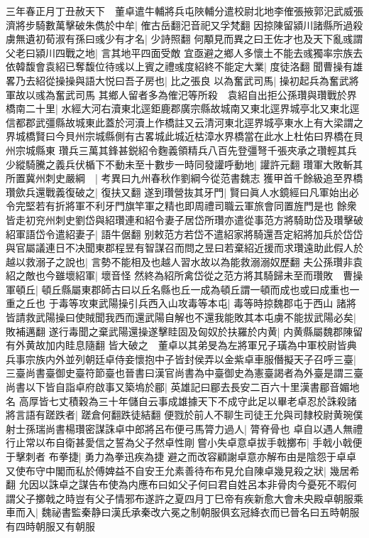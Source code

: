 三年春正月丁丑赦天下　董卓遣牛輔將兵屯陜輔分遣校尉北地李傕張掖郭汜武威張濟將步騎數萬擊破朱儁於中牟|{
	傕古岳翻汜音祀又孚梵翻}
因掠陳留潁川諸縣所過殺虜無遺初荀淑有孫曰彧少有才名|{
	少詩照翻}
何顒見而異之曰王佐才也及天下亂彧謂父老曰潁川四戰之地|{
	言其地平四面受敵}
宜亟避之鄉人多懷土不能去彧獨率宗族去依韓馥會袁紹已奪馥位待彧以上賓之禮彧度紹終不能定大業|{
	度徒洛翻}
聞曹操有雄畧乃去紹從操操與語大悦曰吾子房也|{
	比之張良}
以為奮武司馬|{
	操初起兵為奮武將軍故以彧為奮武司馬}
其鄉人留者多為傕汜等所殺　袁紹自出拒公孫瓚與瓚戰於界橋南二十里|{
	水經大河右瀆東北逕鉅鹿郡廣宗縣故城南又東北逕界城亭北又東北逕信都郡武彊縣故城東此蓋於河瀆上作橋註又云清河東北逕界城亭東水上有大梁謂之界城橋賢曰今貝州宗城縣側有古畧城此城近枯漳水界橋當在此水上杜佑曰界橋在貝州宗城縣東}
瓚兵三萬其鋒甚鋭紹令麴義領精兵八百先登彊弩千張夾承之瓚輕其兵少縱騎騰之義兵伏楯下不動未至十數步一時同發讙呼動地|{
	讙許元翻}
瓚軍大敗斬其所置冀州刺史嚴綱　|{
	考異曰九州春秋作劉綱今從范書魏志}
獲甲首千餘級追至界橋瓚歛兵還戰義復破之|{
	復扶又翻}
遂到瓚營抜其牙門|{
	賢曰眞人水鏡經曰凡軍始出必令完堅若有折將軍不利牙門旗竿軍之精也即周禮司職云軍旅會同置旌門是也}
餘衆皆走初兖州刺史劉岱與紹瓚連和紹令妻子居岱所瓚亦遣從事范方將騎助岱及瓚擊破紹軍語岱令遣紹妻子|{
	語牛倨翻}
别敕范方若岱不遣紹家將騎還吾定紹將加兵於岱岱與官屬議連日不决聞東郡程昱有智謀召而問之昱曰若棄紹近援而求瓚遠助此假人於越以救溺子之說也|{
	言勢不能相及也越人習水故以為能救溺溺奴歷翻}
夫公孫瓚非袁紹之敵也今雖壞紹軍|{
	壞音怪}
然終為紹所禽岱從之范方將其騎歸未至而瓚敗　曹操軍頓丘|{
	頓丘縣屬東郡師古曰以丘名縣也丘一成為頓丘謂一頓而成也或曰成重也一重之丘也}
于毒等攻東武陽操引兵西入山攻毒等本屯|{
	毒等時掠魏郡屯于西山}
諸將皆請救武陽操曰使賊聞我西而還武陽自解也不還我能敗其本屯虜不能拔武陽必矣|{
	敗補邁翻}
遂行毒聞之棄武陽還操遂擊眭固及匈奴於扶羅於内黄|{
	内黄縣屬魏郡陳留有外黄故加内眭息隨翻}
皆大破之　董卓以其弟旻為左將軍兄子璜為中軍校尉皆典兵事宗族内外並列朝廷卓侍妾懷抱中子皆封侯弄以金紫卓車服僭擬天子召呼三臺|{
	三臺尚書臺御史臺符節臺也晉書曰漢官尚書為中臺御史為憲臺謁者為外臺是謂三臺}
尚書以下皆自詣卓府啟事又築塢於郿|{
	英雄記曰郿去長安二百六十里漢書郿音媚地名}
高厚皆七丈積穀為三十年儲自云事成雄據天下不成守此足以畢老卓忍於誅殺諸將言語有蹉跌者|{
	蹉倉何翻跌徒結翻}
便戮於前人不聊生司徒王允與司隸校尉黄琬僕射士孫瑞尚書楊瓚密謀誅卓中郎將呂布便弓馬膂力過人|{
	膂脊骨也}
卓自以遇人無禮行止常以布自衛甚愛信之誓為父子然卓性剛嘗小失卓意卓拔手戟擲布|{
	手戟小戟便于擊刺者}
布拳捷|{
	勇力為拳迅疾為捷}
避之而改容顧謝卓意亦解布由是陰怨于卓卓又使布守中閣而私於傅婢益不自安王允素善待布布見允自陳卓幾見殺之狀|{
	幾居希翻}
允因以誅卓之謀告布使為内應布曰如父子何曰君自姓呂本非骨肉今憂死不暇何謂父子擲戟之時豈有父子情邪布遂許之夏四月丁巳帝有疾新愈大會未央殿卓朝服乘車而入|{
	魏祕書監秦静曰漢氏承秦改六冕之制朝服俱玄冠絳衣而已晉名曰五時朝服有四時朝服又有朝服}
